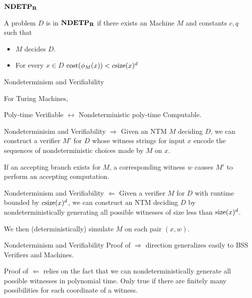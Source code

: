 \documentclass[c]{beamer}
\begin{document}
\begin{frame}{$\mathbf{NDETP_R}$}

  A problem $D$ is in $\mathbf{NDETP_R}$ if there exists an \ndet Machine $M$
  and constants $c, q$ such that 
  \begin{itemize}
  \item $M$ decides $D$.
  \item For every $x \in D$ $\text{cost}(\phi_M(x)) < c \text{size}(x)^d$
  \end{itemize}
  
\end{frame}

\begin{frame}{Nondeterminism and Verifiability}

  For Turing Machines, 
  \begin{center}
    Poly-time Verifiable $\leftrightarrow$ Nondeterministic poly-time
    Computable.
  \end{center}
\end{frame}

\begin{frame}{Nondeterminisim and Verifiability}
  $\Rightarrow$ Given an NTM $M$ deciding $D$, we can construct a
  verifier $M'$ for $D$ whose witness strings for input $x$ encode the
  sequences of nondeterministic choices made by $M$ on $x$.

  \vspace{\baselineskip}
  
  If an accepting branch exists for $M$, a corresponding witness $w$
  causes $M'$ to perform an accepting computation.
\end{frame}

\begin{frame}{Nondeterminism and Verifiability}
  $\Leftarrow$ Given a verifier $M$ for $D$ with runtime bounded by $c
  \text{size}(x)^d$, we can construct an NTM deciding $D$ by
  nondeterministically generating all possible witnesses of size less
  than $\text{size}(x)^d$.

  \vspace{\baselineskip}

  We then (deterministically) simulate $M$ on each pair $(x, w)$.
\end{frame}

\begin{frame}{Nondeterminism and Verifiability}
  Proof of $\Rightarrow$ direction generalizes easily to BSS Verifiers
  and \ndet{} Machines.\pause

  \vspace{\baselineskip}

  Proof of $\Leftarrow$ relies on the fact that we can
  nondeterministically generate all possible witnesses in polynomial
  time. Only true if there are finitely many possibilities for each
  coordinate of a witness.
\end{frame}
\end{document}
